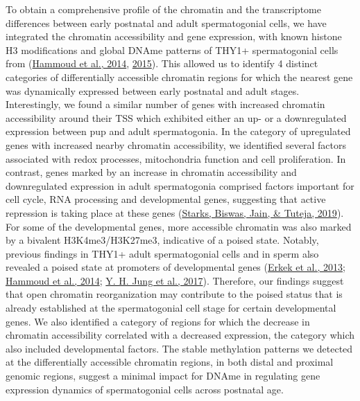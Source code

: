 \documentclass[12pt,twoside]{reedthesis}
\begin{document}
To obtain a comprehensive profile of the chromatin and the transcriptome
differences between early postnatal and adult spermatogonial cells, we
have integrated the chromatin accessibility and gene expression, with
known histone H3 modifications and global DNAme patterns of THY1+
spermatogonial cells from (\protect\hyperlink{ref-hammoud2014}{Hammoud et al., 2014}, \protect\hyperlink{ref-hammoud2015}{2015}). This allowed us
to identify 4 distinct categories of differentially accessible chromatin
regions for which the nearest gene was dynamically expressed between
early postnatal and adult stages. Interestingly, we found a similar
number of genes with increased chromatin accessibility around their TSS
which exhibited either an up- or a downregulated expression between pup
and adult spermatogonia. In the category of upregulated genes with
increased nearby chromatin accessibility, we identified several factors
associated with redox processes, mitochondria function and cell
proliferation. In contrast, genes marked by an increase in chromatin
accessibility and downregulated expression in adult spermatogonia
comprised factors important for cell cycle, RNA processing and
developmental genes, suggesting that active repression is taking place
at these genes (\protect\hyperlink{ref-starks2019}{Starks, Biswas, Jain, \& Tuteja, 2019}). For some of the developmental genes, more
accessible chromatin was also marked by a bivalent H3K4me3/H3K27me3,
indicative of a poised state. Notably, previous findings in THY1+ adult
spermatogonial cells and in sperm also revealed a poised state at
promoters of developmental genes (\protect\hyperlink{ref-erkek2013}{Erkek et al., 2013}; \protect\hyperlink{ref-hammoud2014}{Hammoud et al., 2014}; \protect\hyperlink{ref-jung2017}{Y. H. Jung et al., 2017}).
Therefore, our findings suggest that open chromatin reorganization may
contribute to the poised status that is already established at the
spermatogonial cell stage for certain developmental genes. We also
identified a category of regions for which the decrease in chromatin
accessibility correlated with a decreased expression, the category which
also included developmental factors. The stable methylation patterns we
detected at the differentially accessible chromatin regions, in both
distal and proximal genomic regions, suggest a minimal impact for DNAme
in regulating gene expression dynamics of spermatogonial cells across
postnatal age.
\end{document}
